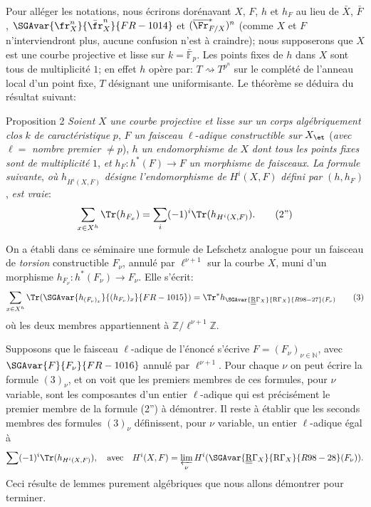Pour alléger les notations, nous écrirons dorénavant $X$, $F$, $h$ et $h_F$ au lieu de $\bar X$, $\bar F$, $\SGAvar{\fr_X^n}{\bar{\fr}_X^n}{FR-1014}$ et $(\overline{\Fr}^*_{F/X})^n$ (comme $X$ et $F$ n'interviendront plus, aucune confusion n'est à craindre); nous supposerons que $X$ est une courbe projective et lisse sur $k=\bar{\mathbb{F}}_p$. Les points fixes de $h$ dans $X$ sont tous de multiplicité $1$; en effet $h$ opère par: $T\rightsquigarrow T^{p^n}$ sur le complété de l'anneau local d'un point fixe, $T$ désignant une uniformisante. Le théorème se déduira du résultat suivant:

\begin{statement}{Proposition 2}
\emph{Soient} $X$ \emph{une courbe projective et lisse sur un corps algébriquement clos} $k$ \emph{de caractéristique} $p$, $F$ \emph{un faisceau}
$\ell$-\emph{adique constructible sur} $X_{\et}$ (\emph{avec} $\ell=$ \emph{nombre premier} $\ne p$), $h$ \emph{un endomorphisme de} $X$ \emph{dont tous les points fixes sont de multiplicité} $1$, \emph{et} $h_F:h^*(F)\to F$ \emph{un morphisme de faisceaux}. \emph{La formule suivante}, \emph{où} $h_{H^i(X,F)}$ \emph{désigne l'endomorphisme de} $H^i(X,F)$ \emph{défini par} $(h,h_F)$, \emph{est vraie}:
\[
\sum_{x\in X^h}\Tr(h_{F_x})=\sum_i(-1)^i\Tr(h_{H^i(X,F)}).
\tag{2''}
\]
\end{statement}

On a établi dans ce séminaire une formule de Lefschetz analogue pour un faisceau de \emph{torsion} constructible $F_\nu$, annulé par $\ell^{\nu+1}$ sur la courbe $X$, muni d'un morphisme $h_{F_\nu}:h^*(F_\nu)\to F_\nu$. Elle s'écrit:
\[
\sum_{x\in X^h}\Tr(\SGAvar{h_{(F_\nu)_x}}{(h_{F_\nu})_x}{FR-1015})=\Tr^*h_{\SGAvar{\underline{\underline{\mathrm{R}}}\Gamma_X}{\mathrm{R}\Gamma_X}{R98-27}(F_\nu)}
\tag{3}
\]
où les deux membres appartiennent à $\mathbb{Z}/\ell^{\nu+1}\mathbb{Z}$.

Supposons que le faisceau $\ell$-adique de l'énoncé s'écrive $F=(F_\nu)_{\nu\in\mathbb{N}}$, avec $\SGAvar{F}{F_\nu}{FR-1016}$ annulé par $\ell^{\nu+1}$. Pour chaque $\nu$ on peut écrire la formule $(3)_\nu$, et on voit que les premiers membres de ces formules, pour $\nu$ variable, sont les composantes d'un entier $\ell$-adique qui est précisément le premier membre de la formule (2'') à démontrer. Il reste à établir que les seconds membres des formules $(3)_\nu$ définissent, pour $\nu$ variable, un entier $\ell$-adique égal à
\[
\sum(-1)^i\Tr(h_{H^i(X,F)}),
\quad\text{avec}\quad
H^i(X,F)=\varprojlim_\nu H^i(\SGAvar{\underline{\underline{\mathrm{R}}}\Gamma_X}{\mathrm{R}\Gamma_X}{R98-28}(F_\nu)).
\]
Ceci résulte de lemmes purement algébriques que nous allons démontrer pour terminer.

